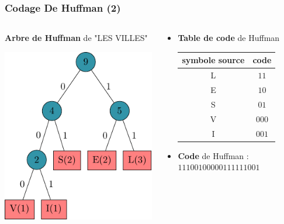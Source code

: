 \documentclass[aspectratio=43]{beamer}
\begin{document}
\begin{frame}
    \frametitle{Codage De Huffman (2)}

    \begin{columns}

        \begin{column}{0.5\textwidth}
            \textbf{Arbre de Huffman} de "LES VILLES"

            \vspace*{2em}

            \includegraphics{img/huffmanExample/huffmanExample.pdf}
        \end{column}

        \begin{column}{0.5\textwidth}
            \centering

            \begin{itemize}
                \item \textbf{Table de code} de Huffman

            \vspace*{1em}

            \begin{tabular}{c | c}
                symbole source & code \\
                \hline
                L & $11$ \\
                E & $10$ \\
                S & $01$ \\
                V & $000$ \\
                I & $001$ \\ \hline
            \end{tabular}
            
            \vspace*{2em}

            \item \textbf{Code} de Huffman : $11100100000111111001$
        \end{itemize}

        \end{column}
    \end{columns}
\end{frame}
\end{document}
